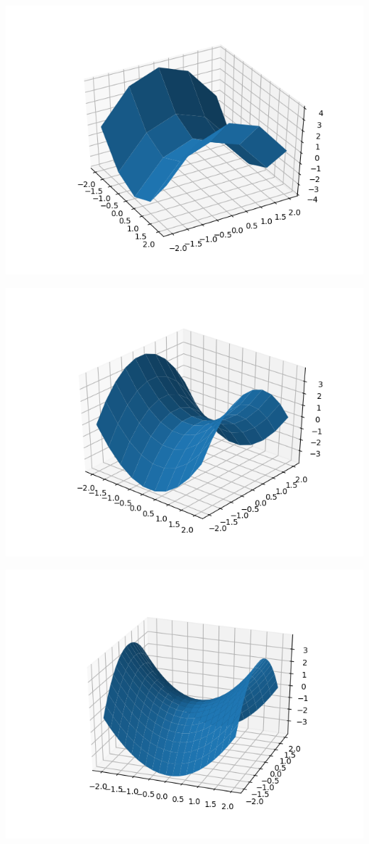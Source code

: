 \documentclass[11pt,class=report,crop=false]{standalone}
\begin{document}
\begin{minipage}{0.45\textwidth}
\begin{center}
  \includegraphics[scale=\myscale,scale=0.45]{figures/pythonxy-selle-1}

\includegraphics[scale=\myscale,scale=0.45]{figures/pythonxy-selle-2}

\includegraphics[scale=\myscale,scale=0.45]{figures/pythonxy-selle-3}
\end{center}
\end{minipage}
\end{document}
